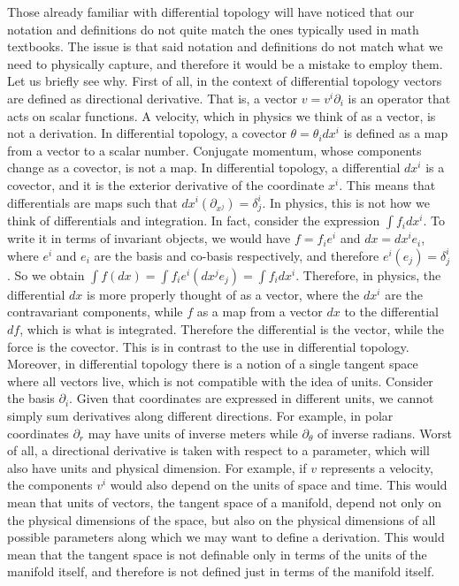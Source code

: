 Those already familiar with differential topology will have noticed that our notation and definitions do not quite match the ones typically used in math textbooks. The issue is that said notation and definitions do not match what we need to physically capture, and therefore it would be a mistake to employ them. Let us briefly see why. First of all, in the context of differential topology vectors are defined as directional derivative. That is, a vector $v = v^i \partial_i$ is an operator that acts on scalar functions. A velocity, which in physics we think of as a vector, is not a derivation. In differential topology, a covector $\theta = \theta_i dx^i $ is defined as a map from a vector to a scalar number. Conjugate momentum, whose components change as a covector, is not a map. In differential topology, a differential $dx^i$ is a covector, and it is the exterior derivative of the coordinate $x^i$. This means that differentials are maps such that $dx^i(\partial_{x^j}) = \delta^i_j$. In physics, this is not how we think of differentials and integration. In fact, consider the expression $\int f_i dx^i$. To write it in terms of invariant objects, we would have $f = f_i e^i$ and $dx = dx^i e_i$, where $e^i$ and $e_i$ are the basis and co-basis respectively, and therefore $e^i(e_j) = \delta^i_j$. So we obtain $\int f( dx ) = \int f_i e^i(dx^j e_j) = \int f_i dx^i$. Therefore, in physics, the differential $dx$ is more properly thought of as a vector, where the $dx^i$ are the contravariant components, while $f$ as a map from a vector $dx$ to the differential $df$, which is what is integrated. Therefore the differential is the vector, while the force is the covector. This is in contrast to the use in differential topology. Moreover, in differential topology there is a notion of a single tangent space where all vectors live, which is not compatible with the idea of units. Consider the basis $\partial_i$. Given that coordinates are expressed in different units, we cannot simply sum derivatives along different directions. For example, in polar coordinates $\partial_r$ may have units of inverse meters while $\partial_\theta$ of inverse radians. Worst of all, a directional derivative is taken with respect to a parameter, which will also have units and physical dimension. For example, if $v$ represents a velocity, the components $v^i$ would also depend on the units of space and time. This would mean that units of vectors, the tangent space of a manifold, depend not only on the physical dimensions of the space, but also on the physical dimensions of all possible parameters along which we may want to define a derivation. This would mean that the tangent space is not definable only in terms of the units of the manifold itself, and therefore is not defined just in terms of the manifold itself.


